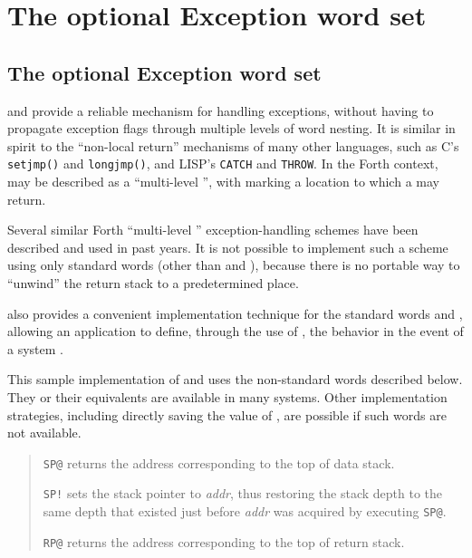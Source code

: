\chapter{The optional Exception word set} %

\begin{info}
\section{The optional Exception word set}

 and  provide a reliable mechanism for
handling exceptions, without having to propagate exception flags
through multiple levels of word nesting. It is similar in spirit
to the ``non-local return'' mechanisms of many other languages,
such as C's \texttt{setjmp()} and \texttt{longjmp()}, and LISP's
\texttt{CATCH} and \texttt{THROW}. In the Forth context, 
may be described as a ``multi-level '', with
 marking a location to which a  may return.

Several similar Forth ``multi-level ''
exception-handling schemes have been described and used in past years.
It is not possible to implement such a scheme using only standard words
(other than  and ), because there is no portable
way to ``unwind'' the return stack to a predetermined place.

 also provides a convenient implementation technique for
the standard words  and , allowing an
application to define, through the use of , the behavior
in the event of a system .

This sample implementation of  and  uses the
non-standard words described below. They or their equivalents are
available in many systems. Other implementation strategies, including
directly saving the value of , are possible if such
words are not available.

\begin{quote}
\texttt{SP@} 
	returns the address corresponding to the top of data stack.

\texttt{SP!} 
	sets the stack pointer to \emph{addr}, thus restoring the stack
	depth to the same depth that existed just before \emph{addr} was
	acquired by executing \texttt{SP@}.

\texttt{RP@} 
	returns the address corresponding to the top of return stack.


\end{quote}
\end{info}
